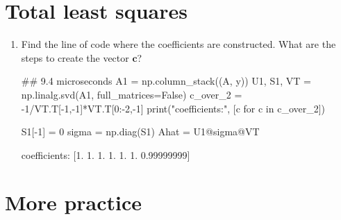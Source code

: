 \documentclass[12pt,letterpaper,noanswers]{exam}
\begin{document}




\section{Total least squares}



\begin{enumerate}[resume]
\item Find the line of code where the coefficients are constructed.  What are the steps to create the vector $\mathbf{c}$?

\begin{pyin}
\## 9.4 microseconds
A1 = np.column_stack((A, y))
U1, S1, VT = np.linalg.svd(A1, full_matrices=False)
c_over_2 = -1/VT.T[-1,-1]*VT.T[0:-2,-1]
print("coefficients:", [c for c in c_over_2])

S1[-1] = 0
sigma = np.diag(S1)
Ahat = U1@sigma@VT
\end{pyin}

\begin{pyout}
coefficients: [1. 1.  1.  1. 1. 1. 0.99999999]
\end{pyout}

\end{enumerate}

\section{More practice}
\end{document}
